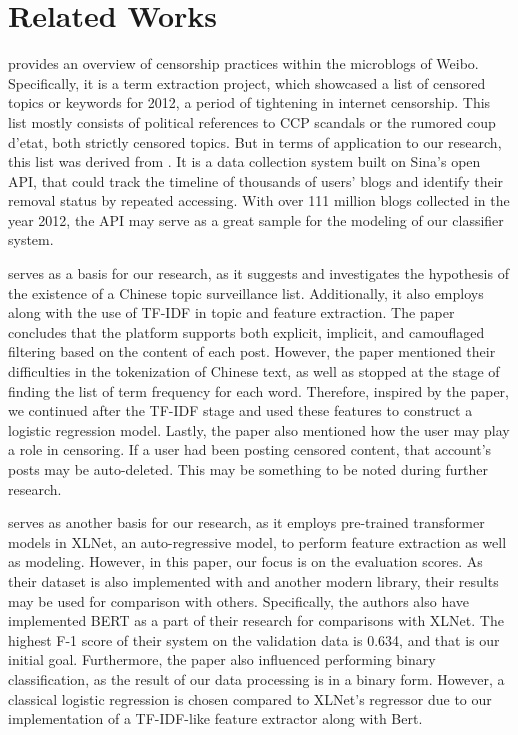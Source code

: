 \section{Related Works}
\citeauthor{w1} provides an overview of censorship practices within the microblogs of Weibo. Specifically, it is a term extraction project, which showcased a list of censored topics or keywords for 2012, a period of tightening in internet censorship. This list mostly consists of political references to CCP scandals or the rumored coup d'etat, both strictly censored topics. But in terms of application to our research, this list was derived from \citeauthor{Fu2021}. It is a data collection system built on Sina’s open API, that could track the timeline of thousands of users’ blogs and identify their removal status by repeated accessing. With over 111 million blogs collected in the year 2012, the API may serve as a great sample for the modeling of our classifier system.


\citeauthor{w2} serves as a basis for our research, as it suggests and investigates the hypothesis of the existence of a Chinese topic surveillance list. Additionally, it also employs \citeauthor{Fu2021} along with the use of TF-IDF in topic and feature extraction. The paper concludes that the platform supports both explicit, implicit, and camouflaged filtering based on the content of each post. However, the paper mentioned their difficulties in the tokenization of Chinese text, as well as stopped at the stage of finding the list of term frequency for each word. Therefore, inspired by the paper, we continued after the TF-IDF stage and used these features to construct a logistic regression model. Lastly, the paper also mentioned how the user may play a role in censoring. If a user had been posting censored content, that account’s posts may be auto-deleted. This may be something to be noted during further research.


\citeauthor{ahmed-kumar-m-2021-classification} serves as another basis for our research, as it employs pre-trained transformer models in XLNet, an auto-regressive model, to perform feature extraction as well as modeling. However, in this paper, our focus is on the evaluation scores. As their dataset is also implemented with \citeauthor{Fu2021} and another modern library, their results may be used for comparison with others. Specifically, the authors also have implemented BERT as a part of their research for comparisons with XLNet. The highest F-1 score of their system on the validation data is 0.634, and that is our initial goal. Furthermore, the paper also influenced performing binary classification, as the result of our data processing is in a binary form. However, a classical logistic regression is chosen compared to XLNet’s regressor due to our implementation of a TF-IDF-like feature extractor along with Bert.


